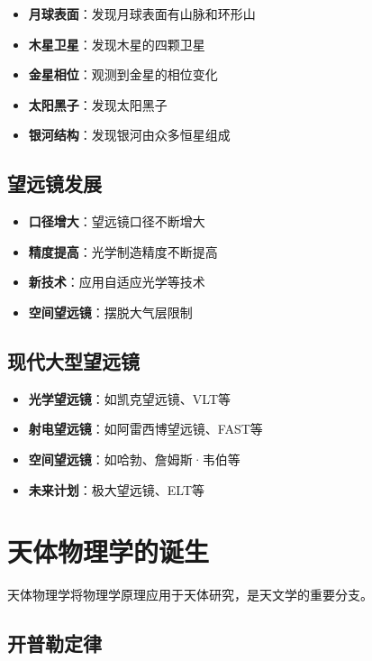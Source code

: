 \documentclass[12pt,UTF8]{ctexbook}
\begin{document}
\begin{itemize}
  \item \textbf{月球表面}：发现月球表面有山脉和环形山
  \item \textbf{木星卫星}：发现木星的四颗卫星
  \item \textbf{金星相位}：观测到金星的相位变化
  \item \textbf{太阳黑子}：发现太阳黑子
  \item \textbf{银河结构}：发现银河由众多恒星组成
\end{itemize}

\subsection{望远镜发展}

\begin{itemize}
  \item \textbf{口径增大}：望远镜口径不断增大
  \item \textbf{精度提高}：光学制造精度不断提高
  \item \textbf{新技术}：应用自适应光学等技术
  \item \textbf{空间望远镜}：摆脱大气层限制
\end{itemize}

\subsection{现代大型望远镜}

\begin{itemize}
  \item \textbf{光学望远镜}：如凯克望远镜、VLT等
  \item \textbf{射电望远镜}：如阿雷西博望远镜、FAST等
  \item \textbf{空间望远镜}：如哈勃、詹姆斯·韦伯等
  \item \textbf{未来计划}：极大望远镜、ELT等
\end{itemize}

\section{天体物理学的诞生}

天体物理学将物理学原理应用于天体研究，是天文学的重要分支。

\subsection{开普勒定律}
\end{document}
